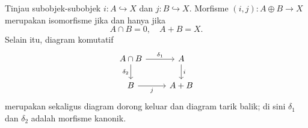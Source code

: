\begin{proposisi}\label{prop:biproduct-sum-intersection}
	Tinjau subobjek-subobjek $i:A\hookrightarrow X$ dan
	$j:B\hookrightarrow X$. Morfisme $(i,j):A\oplus B\to X$ merupakan
	isomorfisme jika dan hanya jika
	\[ A \cap B = 0, \quad A + B = X. \]
	Selain itu, diagram komutatif
	\[\begin{tikzcd}
		A \cap B \arrow[r, "\delta_1"] \arrow[d, "\delta_2"'] & A \arrow[d, "i"] \\
		B \arrow[r, "j"'] & A + B
	\end{tikzcd}\]
	merupakan sekaligus diagram dorong keluar dan diagram tarik balik; di sini
	$\delta_1$ dan $\delta_2$ adalah morfisme kanonik.
\end{proposisi}
